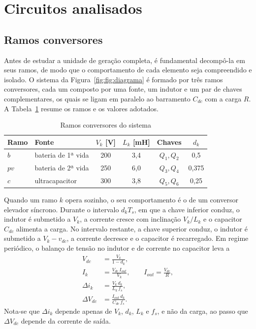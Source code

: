 \section{Circuitos analisados}
\label{sec:circuitos}

\subsection{Ramos conversores}

Antes de estudar a unidade de geração completa, é fundamental decompô-la em seus ramos, de modo que o comportamento de cada elemento seja compreendido e isolado. O sistema da Figura~\ref{fig:fig:diagrama} é formado por três ramos conversores, cada um composto por uma fonte, um indutor e um par de chaves complementares, os quais se ligam em paralelo ao barramento $C_{dc}$ com a carga $R$. A Tabela~\ref{tab:ramos} resume os ramos e os valores adotados.

\begin{table}[H]
\centering
\caption{Ramos conversores do sistema}
\label{tab:ramos}
\footnotesize
\setlength{\tabcolsep}{3pt}
\begin{tabular}{llcccc}
\toprule
Ramo & Fonte & $V_k$ [V] & $L_k$ [mH] & Chaves & $d_k$ \\
\midrule
$b$ & bateria de 1ª vida & 200 & 3,4 & $Q_1,Q_2$ & 0,5 \\
$pv$ & bateria de 2ª vida & 250 & 6,0 & $Q_3,Q_4$ & 0,375 \\
$c$ & ultracapacitor & 300 & 3,8 & $Q_5,Q_6$ & 0,25 \\
\bottomrule
\end{tabular}
\end{table}

Quando um ramo $k$ opera sozinho, o seu comportamento é o de um conversor elevador síncrono. Durante o intervalo $d_kT_s$, em que a chave inferior conduz, o indutor é submetido a $V_k$, a corrente cresce com inclinação $V_k/L_k$ e o capacitor $C_{dc}$ alimenta a carga. No intervalo restante, a chave superior conduz, o indutor é submetido a $V_k-v_{dc}$, a corrente decresce e o capacitor é recarregado. Em regime periódico, o balanço de tensão no indutor e de corrente no capacitor leva a
\begin{align}
V_{dc}&=\frac{V_k}{1-d_k},\label{eq:ramo_ganho}\\
I_k&=\frac{V_{dc}\,I_{out}}{V_k},\qquad I_{out}=\frac{V_{dc}}{R},\label{eq:ramo_I}\\
\Delta i_k&=\frac{V_k\,d_k}{L_k\,f_s},\label{eq:ramo_di}\\
\Delta V_{dc}&=\frac{I_{out}\,d_k}{C_{dc}\,f_s}.\label{eq:ramo_dv}
\end{align}
Nota-se que $\Delta i_k$ depende apenas de $V_k$, $d_k$, $L_k$ e $f_s$, e não da carga, ao passo que $\Delta V_{dc}$ depende da corrente de saída.

